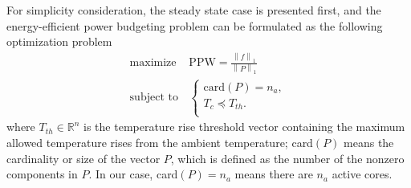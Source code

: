 For simplicity consideration, the steady state case is presented first, and the energy-efficient power budgeting problem can be formulated as the following optimization problem
\begin{equation}\label{eq:opt_ppw}
\begin{split}
\text{maximize } & \text{PPW} = \frac{\left \| f \right \|_{1}}{\left \| P \right \|_{1}}\\
\text{subject to} &\left\{
\begin{array}{lr}
\text{card}(P) = n_{a},\\
T_{c} \preceq T_{th}.\\
\end{array}
\right.
\end{split}
\end{equation}
where $T_{th} \in \mathbb{R}^{n}$ is the temperature rise threshold vector containing the maximum allowed temperature rises from the ambient temperature; card$(P)$ means the cardinality or size of the vector $P$, which is defined as the number of the nonzero components in $P$. In our case, card$(P) = n_{a}$ means there are $n_{a}$ active cores.


